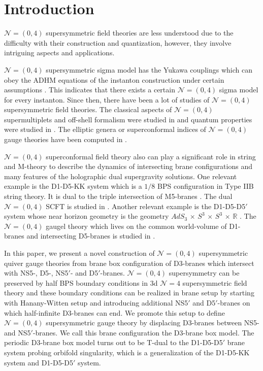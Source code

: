 \documentclass{article}
\numberwithin{equation}{section}
\begin{document}
\section{Introduction}
\label{sec_intro}
$\mathcal{N}=(0,4)$ supersymmetric field theories are less 
understood due to the difficulty with their construction and quantization, 
however, they involve intriguing aspects and applications. 

$\mathcal{N}=(0,4)$ supersymmetric sigma model 
has the Yukawa couplings which can obey the ADHM equations of the instanton construction 
under certain assumptions \cite{Witten:1994tz}. 
This indicates that there exists a certain $\mathcal{N}=(0,4)$ sigma model for every instanton. 
Since then, there have been a lot of studies of $\mathcal{N}=(0,4)$ supersymmetric field theories. 
The classical aspects of $\mathcal{N}=(0,4)$ supermultiplets 
and off-shell formalism were studied in \cite{Gates:1994bu, Galperin:1994qn, Galperin:1995pq} 
and quantum properties were studied in \cite{Lambert:1995dp}. 
The elliptic genera or superconformal indices of $\mathcal{N}=(0,4)$ gauge theories 
have been computed in \cite{Putrov:2015jpa, Gadde:2015tra}. 




$\mathcal{N}=(0,4)$ superconformal field theory also can play a significant role in string and M-theory 
to describe the dynamics of intersecting brane configurations 
and many features of the holographic dual supergravity solutions. 
One relevant example is the D1-D5-KK system which is a $1/8$ BPS configuration in Type IIB string theory. 
It is dual to the triple intersection of M5-branes \cite{Maldacena:1997de, Minasian:1999qn}. 
The dual $\mathcal{N}=(0,4)$ SCFT is studied in \cite{Sugawara:1999qp, Okuyama:2005gq}. 
Another relevant example is the D1-D5-D5$'$ system 
whose near horizon geometry is 
the geometry $AdS_{3}$ $\times$ $S^{3}$ $\times$ $S^{3}$ $\times$ $\mathbb{R}$ 
\cite{Cowdall:1998bu, Boonstra:1998yu, Gauntlett:1998kc}. 
The $\mathcal{N}=(0,4)$ gaugel theory which lives on the 
common world-volume of D1-branes and intersecting D5-branes is studied in \cite{Tong:2014yna}. 






In this paper, we present a novel construction of $\mathcal{N}=(0,4)$ supersymmetric quiver gauge theories 
from brane box configuration of D3-branes which intersect with NS5-, D5-, NS5$'$- and D5$'$-branes. 
$\mathcal{N}=(0,4)$ supersymmetry can be preserved by half BPS boundary conditions 
in 3d $\mathcal{N}=4$ supersymmetric field theory \cite{Chung:2016pgt} 
and these boundary conditions can be realized in brane setup by starting with Hanany-Witten setup \cite{Hanany:1996ie} 
and introducing additional NS5$'$ and D5$'$-branes on which half-infinite D3-branes can end. 
We promote this setup to define $\mathcal{N}=(0,4)$ supersymmetric gauge theory 
by displacing D3-branes between NS5- and NS5$'$-branes. 
We call this brane configuration the D3-brane box model. 
The periodic D3-brane box model turns out to be T-dual to the D1-D5-D5$'$ brane system probing orbifold singularity, 
which is a generalization of the D1-D5-KK system and D1-D5-D5$'$ system. 
\end{document}
